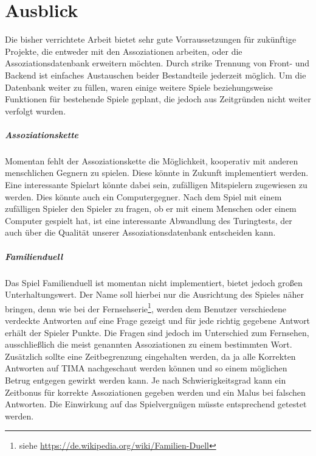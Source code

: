 \chapter{Ausblick}

Die bisher verrichtete Arbeit bietet sehr gute Vorraussetzungen für zukünftige Projekte, die entweder mit den Assoziationen arbeiten, oder die Assoziationsdatenbank erweitern möchten. Durch strike Trennung von Front- und Backend ist einfaches Austauschen beider Bestandteile jederzeit möglich.
Um die Datenbank weiter zu füllen, waren einige weitere Spiele beziehungsweise Funktionen für bestehende Spiele geplant, die jedoch aus Zeitgründen nicht weiter verfolgt wurden.

\paragraph{Assoziationskette}
Momentan fehlt der Assoziationskette die Möglichkeit, kooperativ mit anderen menschlichen Gegnern zu spielen. Diese könnte in Zukunft implementiert werden. Eine interessante Spielart könnte dabei sein, zufälligen Mitspielern zugewiesen zu werden. Dies könnte auch ein Computergegner. Nach dem Spiel mit einem zufälligen Spieler den Spieler zu fragen, ob er mit einem Menschen oder einem Computer gespielt hat, ist eine interessante Abwandlung des Turingtests, der auch über die Qualität unserer Assoziationsdatenbank entscheiden kann.

\paragraph{Familienduell}
Das Spiel Familienduell ist momentan nicht implementiert, bietet jedoch großen Unterhaltungswert. Der Name soll hierbei nur die Ausrichtung des Spieles näher bringen,
denn wie bei der
Fernsehserie\footnote{siehe \url{https://de.wikipedia.org/wiki/Familien-Duell}},
werden dem Benutzer verschiedene verdeckte Antworten auf eine Frage gezeigt
und für jede richtig gegebene Antwort erhält der Spieler Punkte.
Die Fragen sind jedoch im Unterschied zum Fernsehen, ausschließlich die meist
genannten Assoziationen zu einem bestimmten Wort. Zusätzlich sollte eine
Zeitbegrenzung eingehalten werden, da ja alle Korrekten Antworten auf TIMA
nachgeschaut werden können und so einem möglichen Betrug entgegen gewirkt werden
kann. Je nach Schwierigkeitsgrad kann ein Zeitbonus für korrekte Assoziationen
gegeben werden und ein Malus bei falschen Antworten. Die Einwirkung auf das
Spielvergnügen müsste entsprechend getestet werden.

